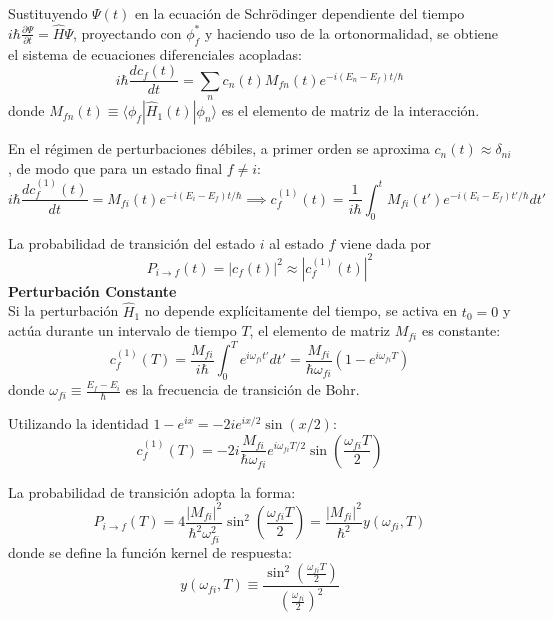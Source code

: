 Sustituyendo $\Psi(t)$ en la ecuación de Schrödinger dependiente del tiempo $i\hbar \frac{\partial \Psi}{\partial t} = \hat{H}\Psi$, proyectando con $\phi_f^*$ y haciendo uso de la ortonormalidad, se obtiene el sistema de ecuaciones diferenciales acopladas:
\begin{equation}
i\hbar \frac{d c_f(t)}{dt} = \sum_n c_n(t) M_{fn}(t) e^{-i (E_n - E_f) t / \hbar}
\end{equation}
donde $M_{fn}(t) \equiv \langle \phi_f | \hat{H}_1(t) | \phi_n \rangle$ es el elemento de matriz de la interacción.

En el régimen de perturbaciones débiles, a primer orden se aproxima $c_n(t) \approx \delta_{ni}$, de modo que para un estado final $f \neq i$:
\begin{equation}
i\hbar \frac{d c_f^{(1)}(t)}{dt} = M_{fi}(t) e^{-i (E_i - E_f) t / \hbar} \implies c_f^{(1)}(t) = \frac{1}{i\hbar} \int_0^t M_{fi}(t') e^{-i (E_i - E_f) t' / \hbar} dt'
\end{equation}

La probabilidad de transición del estado $i$ al estado $f$ viene dada por
\[
P_{i \to f}(t) = |c_f(t)|^2 \approx |c_f^{(1)}(t)|^2
\]
\textbf{Perturbación Constante}\\
Si la perturbación $\hat{H}_1$ no depende explícitamente del tiempo, se activa en $t_0 = 0$ y actúa durante un intervalo de tiempo $T$, el elemento de matriz $M_{fi}$ es constante:
\begin{equation}
c_f^{(1)}(T) = \frac{M_{fi}}{i\hbar} \int_0^T e^{i \omega_{fi} t'} dt' = \frac{M_{fi}}{\hbar \omega_{fi}} \left( 1 - e^{i \omega_{fi} T} \right)
\end{equation}
donde $\omega_{fi} \equiv \frac{E_f - E_i}{\hbar}$ es la frecuencia de transición de Bohr.

Utilizando la identidad $1 - e^{ix} = -2i e^{ix/2} \sin(x/2)$:
\begin{equation}
c_f^{(1)}(T) = -2i \frac{M_{fi}}{\hbar \omega_{fi}} e^{i \omega_{fi} T / 2} \sin\left(\frac{\omega_{fi} T}{2}\right)
\end{equation}

La probabilidad de transición adopta la forma:
\begin{equation}
P_{i \to f}(T) = 4 \frac{|M_{fi}|^2}{\hbar^2 \omega_{fi}^2} \sin^2\left(\frac{\omega_{fi} T}{2}\right) = \frac{|M_{fi}|^2}{\hbar^2} y(\omega_{fi}, T)
\end{equation}
donde se define la función kernel de respuesta:
\begin{equation}
y(\omega_{fi}, T) \equiv \frac{\sin^2\left( \frac{\omega_{fi} T}{2} \right)}{\left( \frac{\omega_{fi}}{2} \right)^2}
\end{equation}

